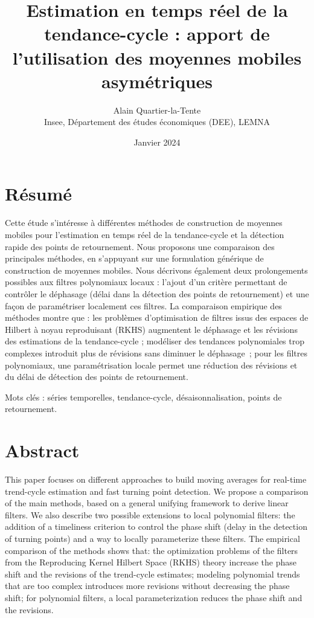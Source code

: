 \documentclass[
  12pt,
  a4paper,french]{article}
\title{Estimation en temps réel de la tendance-cycle : apport de l'utilisation des moyennes mobiles asymétriques}
\author{Alain Quartier-la-Tente\\
Insee, Département des études économiques (DEE), LEMNA}
\date{Janvier 2024}
\newcommand\1{\mathds{1}}
\begin{document}
\maketitle

\thispagestyle{fancy}

\hypertarget{ruxe9sumuxe9}{%
\section*{Résumé}\label{ruxe9sumuxe9}}

Cette étude s'intéresse à différentes méthodes de construction de
moyennes mobiles pour l'estimation en temps réel de la tendance-cycle et
la détection rapide des points de retournement. Nous proposons une
comparaison des principales méthodes, en s'appuyant sur une formulation
générique de construction de moyennes mobiles. Nous décrivons également
deux prolongements possibles aux filtres polynomiaux locaux : l'ajout
d'un critère permettant de contrôler le déphasage (délai dans la
détection des points de retournement) et une façon de paramétriser
localement ces filtres. La comparaison empirique des méthodes montre que
: les problèmes d'optimisation de filtres issus des espaces de Hilbert à
noyau reproduisant (RKHS) augmentent le déphasage et les révisions des
estimations de la tendance-cycle ; modéliser des tendances polynomiales
trop complexes introduit plus de révisions sans diminuer le déphasage~;
pour les filtres polynomiaux, une paramétrisation locale permet une
réduction des révisions et du délai de détection des points de
retournement.

Mots clés : séries temporelles, tendance-cycle, désaisonnalisation,
points de retournement.

\hypertarget{abstract}{%
\section*{Abstract}\label{abstract}}

This paper focuses on different approaches to build moving averages for
real-time trend-cycle estimation and fast turning point detection. We
propose a comparison of the main methods, based on a general unifying
framework to derive linear filters. We also describe two possible
extensions to local polynomial filters: the addition of a timeliness
criterion to control the phase shift (delay in the detection of turning
points) and a way to locally parameterize these filters. The empirical
comparison of the methods shows that: the optimization problems of the
filters from the Reproducing Kernel Hilbert Space (RKHS) theory increase
the phase shift and the revisions of the trend-cycle estimates; modeling
polynomial trends that are too complex introduces more revisions without
decreasing the phase shift; for polynomial filters, a local
parameterization reduces the phase shift and the revisions.
\end{document}
